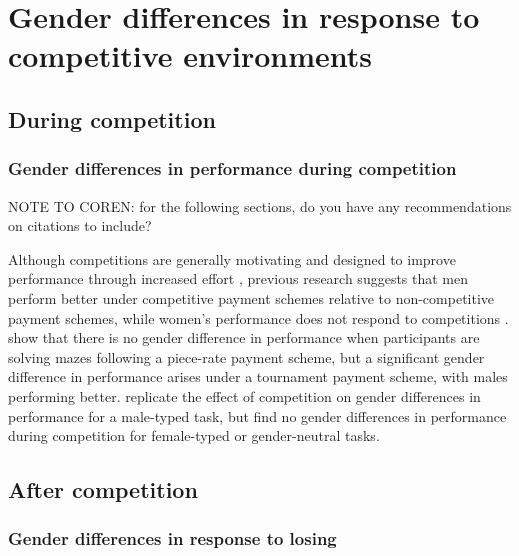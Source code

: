 \documentclass[a4paper, nobind]{templates/ociamthesis}
\begin{document}
\hypertarget{gender-differences-in-response-to-competitive-environments}{%
\section{Gender differences in response to competitive environments}\label{gender-differences-in-response-to-competitive-environments}}

\hypertarget{during-competition}{%
\subsection{During competition}\label{during-competition}}

\hypertarget{gender-differences-in-performance-during-competition}{%
\subsubsection{Gender differences in performance during competition}\label{gender-differences-in-performance-during-competition}}

NOTE TO COREN: for the following sections, do you have any recommendations on citations to include?

Although competitions are generally motivating and designed to improve performance through increased effort \autocite{Connelly2014a,Murayama2012,Miller2019a}, previous research suggests that men perform better under competitive payment schemes relative to non-competitive payment schemes, while women's performance does not respond to competitions \autocite{Gneezy2003,Gneezy2004,Gunther2010,Samak2013}. \textcite{Gneezy2003} show that there is no gender difference in performance when participants are solving mazes following a piece-rate payment scheme, but a significant gender difference in performance arises under a tournament payment scheme, with males performing better. \textcite{Gunther2010} replicate the effect of competition on gender differences in performance for a male-typed task, but find no gender differences in performance during competition for female-typed or gender-neutral tasks.

\hypertarget{after-competition}{%
\subsection{After competition}\label{after-competition}}

\hypertarget{gender-differences-in-response-to-losing}{%
\subsubsection{Gender differences in response to losing}\label{gender-differences-in-response-to-losing}}
\end{document}

